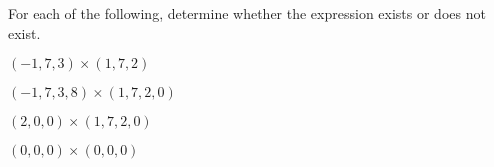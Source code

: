 \begin{problem}
For each of the following, determine whether the expression exists or does not exist.

$(-1,7,3)\times(1,7,2)$
\begin{multipleChoice}
\end{multipleChoice}

$(-1,7,3,8)\times(1,7,2,0)$
\begin{multipleChoice}
\end{multipleChoice}

$(2,0,0)\times(1,7,2,0)$
\begin{multipleChoice}
\end{multipleChoice}

$(0,0,0)\times(0,0,0)$
\begin{multipleChoice}
\end{multipleChoice}
\end{problem}